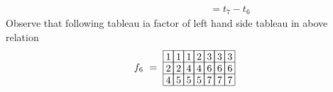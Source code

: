 {\begin{align*}
&\hspace{100pt}
= t_7 - t_6
\end{align*}
Observe that following tableau ia factor of left hand side tableau in above relation
\[
{\def\lr#1{\multicolumn{1}{|@{\hspace{.6ex}}c@{\hspace{.6ex}}|}{\raisebox{-.3ex}{$#1$}}}
\raisebox{-.6ex}{$f_6\ =\ \begin{array}[c]{*{7}c}\cline{1-7}
\lr{1}&\lr{1}&\lr{1}&\lr{2}&\lr{3}&\lr{3}&\lr{3}\\\cline{1-7}
\lr{2}&\lr{2}&\lr{4}&\lr{4}&\lr{6}&\lr{6}&\lr{6}\\\cline{1-7}
\lr{4}&\lr{5}&\lr{5}&\lr{5}&\lr{7}&\lr{7}&\lr{7}\\\cline{1-7}
\end{array}$}
}
\]
}

%





